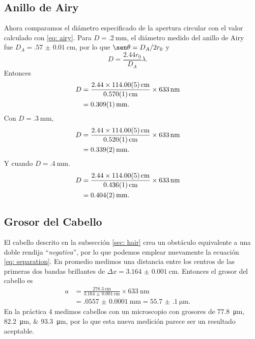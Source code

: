 \subsection{Anillo de Airy}
Ahora comparamos el diámetro especificado de la apertura circular con el valor calculado con \eqref{eq: airy}.
Para $D = \qty{.2}{\mm}$, el diámetro medido del anillo de Airy fue $D_A = \qty{.57(1)}{\cm}$, por lo que $\sen \theta = D_A/2r_0$ y
\begin{equation}
	D = \frac{2.44 r_0}{D_A}\lambda.
\end{equation}
Entonces
\begin{equation}
\begin{split}
	D &= \frac{2.44 \times \qty{114\pm .05}{cm}}{\qty{.570(1)}{\cm}}\times \qty{633}{\nm}\\
	&= \qty{.309(1)}{\mm}.
\end{split}
\end{equation}
Con $D = \qty{.3}{\mm}$,
\begin{equation}
\begin{split}
	D &= \frac{2.44 \times \qty{114\pm .05}{cm}}{\qty{.520(1)}{\cm}}\times \qty{633}{\nm}\\
	&= \qty{.339(2)}{\mm}.
\end{split}
\end{equation}
Y cuando $D = \qty{.4}{\mm}$.
\begin{equation}
\begin{split}
	D &= \frac{2.44 \times \qty{114\pm .05}{cm}}{\qty{.436(1)}{\cm}}\times \qty{633}{\nm}\\
	&= \qty{.404(2)}{\mm}.
\end{split}
\end{equation}

\subsection{Grosor del Cabello}
El cabello descrito en la subsección \ref{sec: hair} crea un obstáculo equivalente a una doble rendija ``\emph{negativa}'', por lo que podemos emplear nuevamente la ecuación \eqref{eq: separation}. En promedio medimos una distancia entre los centros de las primeras dos bandas brillantes de $\Delta x = \qty{3.164(1)}{\cm}$. Entonces el grosor del cabello es
\begin{equation}
\begin{split}
	a &= \frac{\qty{278.3}{\cm}}{\qty{3.164(1)}{\cm}}\times \qty{633}{\nm}\\
	&= \qty{.0557(1)}{\mm} = \qty{55.7(1)}{\micro\m}.
\end{split}
\end{equation}
En la práctica 4 medimos cabellos con un microscopio con grosores de \qtylist{77.8; 82.2; 93.3}{\micro\m}, por lo que esta nueva medición parece ser un resultado aceptable.